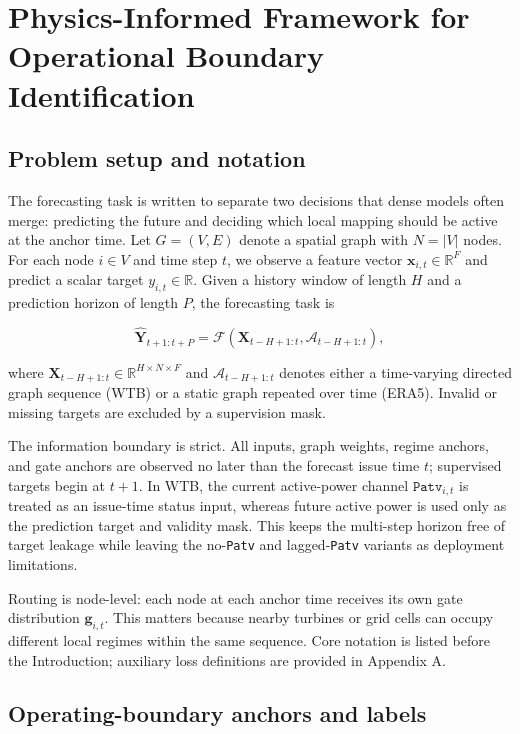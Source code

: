 \documentclass[
  11pt]{article}
\begin{document}
\section{Physics-Informed Framework for Operational Boundary
Identification}\label{physics-informed-framework-for-operational-boundary-identification}

\subsection{Problem setup and
notation}\label{problem-setup-and-notation}

The forecasting task is written to separate two decisions that dense
models often merge: predicting the future and deciding which local
mapping should be active at the anchor time. Let \(G=(V,E)\) denote a
spatial graph with \(N=|V|\) nodes. For each node \(i \in V\) and time
step \(t\), we observe a feature vector
\(\mathbf{x}_{i,t} \in \mathbb{R}^{F}\) and predict a scalar target
\(y_{i,t} \in \mathbb{R}\). Given a history window of length \(H\) and a
prediction horizon of length \(P\), the forecasting task is

\[
\hat{\mathbf{Y}}_{t+1:t+P} = \mathcal{F}\!\left(\mathbf{X}_{t-H+1:t}, \mathcal{A}_{t-H+1:t}\right),
\]

where \(\mathbf{X}_{t-H+1:t} \in \mathbb{R}^{H \times N \times F}\) and
\(\mathcal{A}_{t-H+1:t}\) denotes either a time-varying directed graph
sequence (WTB) or a static graph repeated over time (ERA5). Invalid or
missing targets are excluded by a supervision mask.

The information boundary is strict. All inputs, graph weights, regime
anchors, and gate anchors are observed no later than the forecast issue
time \(t\); supervised targets begin at \(t+1\). In WTB, the current
active-power channel \(\texttt{Patv}_{i,t}\) is treated as an issue-time
status input, whereas future active power is used only as the prediction
target and validity mask. This keeps the multi-step horizon free of
target leakage while leaving the no-\texttt{Patv} and
lagged-\texttt{Patv} variants as deployment limitations.

Routing is node-level: each node at each anchor time receives its own
gate distribution \(\mathbf{g}_{i,t}\). This matters because nearby
turbines or grid cells can occupy different local regimes within the
same sequence. Core notation is listed before the Introduction;
auxiliary loss definitions are provided in Appendix A.

\subsection{Operating-boundary anchors and
labels}\label{operating-boundary-anchors-and-labels}
\end{document}
